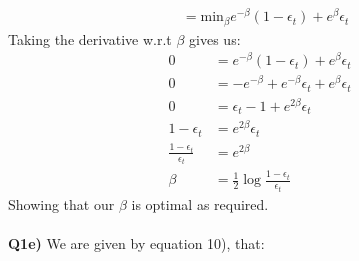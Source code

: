 \documentclass{article}
\begin{document}
\begin{titlepage}
\begin{align*}
&= \text{min}_{\beta}  e^{-\beta} (1-\epsilon_t) +  e^{\beta} \epsilon_t
\end{align*}
Taking the derivative w.r.t $\beta$ gives us:
\begin{align*}
0 &=  e^{-\beta} (1-\epsilon_t) +  e^{\beta} \epsilon_t \\
0 &=  -e^{-\beta} + e^{-\beta}\epsilon_t +  e^{\beta} \epsilon_t \\
0 &= \epsilon_t - 1 + e^{2\beta} \epsilon_t \\
1 - \epsilon_t &= e^{2\beta} \epsilon_t \\
\frac{1 - \epsilon_t}{\epsilon_t} &= e^{2\beta} \\
\beta &= \frac{1}{2} \log \frac{1-\epsilon_t}{\epsilon_t}
\end{align*}
Showing that our $\beta$ is optimal as required. \\\\
\textbf{Q1e)} We are given by equation 10), that:
\end{titlepage}
\end{document}
